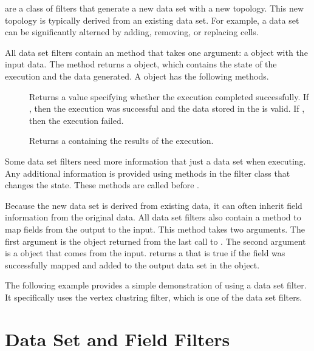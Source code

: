  are a class of filters that generate a new data
set with a new topology. This new topology is typically derived from an
existing data set. For example, a data set can be significantly alterned by
adding, removing, or replacing cells.

All data set filters contain an  method that takes one
argument: a  object with the input data. The
 method returns a  object,
which contains the state of the execution and the data generated. A
 object has the following methods.

\begin{description}
\item[] Returns a  value specifying
  whether the execution completed successfully. If , then
  the execution was successful and the data stored in the
   is valid. If , then the
  execution failed.
\item[] Returns a  containing
  the results of the execution.
\end{description}

Some data set filters need more information that just a data set when
executing. Any additional information is provided using methods in the
filter class that changes the state. These methods are called before
.

Because the new data set is derived from existing data, it can often
inherit field information from the original data. All data set filters also
contain a  method to map fields from the
output to the input. This method takes two arguments. The first argument is
the  object returned from the last call to
. The second argument is a  object that
comes from the input.  returns a
 that is true if the field was successfully mapped and added
to the output data set in the  object.

The following example provides a simple demonstration of using a data set
filter. It specifically uses the vertex clustring filter, which is one of
the data set filters.




\section{Data Set and Field Filters}





